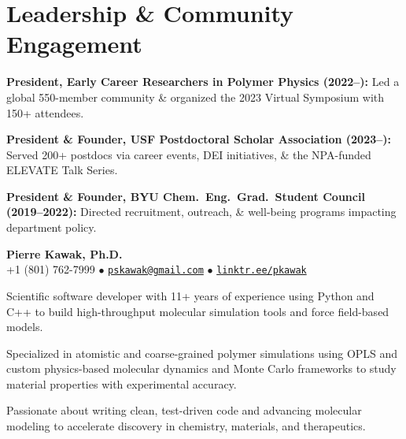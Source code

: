 \section*{Leadership \& Community Engagement}
\begin{tabitemize}
  \item \textbf{President, Early Career Researchers in Polymer Physics (2022–):} Led a global 550-member community \& organized the 2023 Virtual Symposium with 150+ attendees.
  \item \textbf{President \& Founder, USF Postdoctoral Scholar Association (2023–):} Served 200+ postdocs via career events, DEI initiatives, \& the NPA-funded ELEVATE Talk Series.
  \item \textbf{President \& Founder, BYU Chem.~Eng.~Grad.~Student Council (2019–2022):} Directed recruitment, outreach, \& well-being programs impacting department policy.
\end{tabitemize}
\vspace{1.0\baselineskip}

\begin{center}
  {\LARGE \textbf{Pierre Kawak, Ph.D.} }\\[1ex]
  +1 (801) 762-7999 $\bullet$ \href{mailto:pskawak@gmail.com}{\tt pskawak@gmail.com} $\bullet$ \href{https://linktr.ee/pkawak}{\tt linktr.ee/pkawak}\\
\end{center}
\begin{tabitemize}
  \item Scientific software developer with 11+ years of experience using Python and C++ to build high-throughput molecular simulation tools and force field-based models.
  \item Specialized in atomistic and coarse-grained polymer simulations using OPLS and custom physics-based molecular dynamics and Monte Carlo frameworks to study material properties with experimental accuracy.
  \item Passionate about writing clean, test-driven code and advancing molecular modeling to accelerate discovery in chemistry, materials, and therapeutics.
\end{tabitemize}
